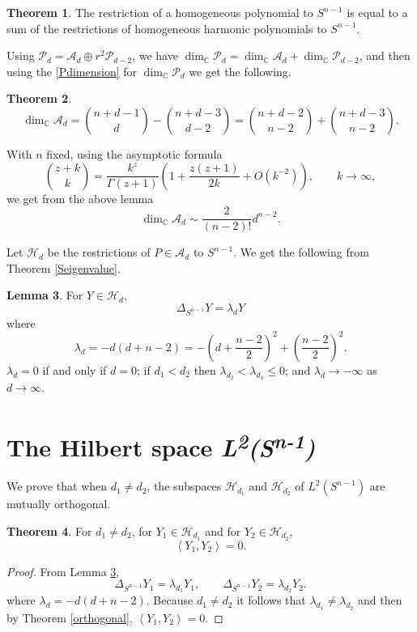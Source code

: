 \documentclass{article}
\newcommand{\inner}[2]{\left\langle #1, #2 \right\rangle}
\theoremstyle{definition}
\newtheorem{theorem}{Theorem}
\newtheorem{lemma}[theorem]{Lemma}
\theoremstyle{definition}
\begin{document}
\begin{theorem}
The restriction of a homogeneous polynomial to $S^{n-1}$ is equal to a sum of the restrictions of homogeneous 
harmonic polynomials to $S^{n-1}$. 
\label{homogeneoussum}
\end{theorem}

Using $\mathscr{P}_d = \mathscr{A}_d \oplus r^2 \mathscr{P}_{d-2}$, we
have $\dim_\mathbb{C} \mathscr{P}_d = \dim_{\mathbb{C}} \mathscr{A}_d + \dim_{\mathbb{C}} \mathscr{P}_{d-2}$, and then using
the  \eqref{Pdimension} for $\dim_\mathbb{C} \mathscr{P}_d$ we get the following.

\begin{theorem}
\[
\dim_\mathbb{C} \mathscr{A}_d = \binom{n+d-1}{d}-\binom{n+d-3}{d-2}
=\binom{n+d-2}{n-2}+\binom{n+d-3}{n-2}.
\]
\label{dimension}
\end{theorem}

With $n$ fixed, using the asymptotic formula
\[
\binom{z+k}{k} = \frac{k^z}{\Gamma(z+1)} \left(1+\frac{z(z+1)}{2k}+O(k^{-2})\right),\qquad k \to \infty,
\]
we get from the above lemma 
\[
\dim_\mathbb{C} \mathscr{A}_d  \sim \frac{2}{(n-2)!} d^{n-2}.
\]

Let $\mathscr{H}_d$ be the restrictions of $P \in \mathscr{A}_d$ to $S^{n-1}$. 
We get the following from  Theorem \ref{Seigenvalue}.

\begin{lemma}
For $Y \in \mathscr{H}_d$,
\[
\Delta_{S^{n-1}} Y =\lambda_d Y
\]
where
\[
\lambda_d = 
 -d(d+n-2)
 =
-\left(d+\frac{n-2}{2}\right)^2+\left(\frac{n-2}{2}\right)^2.
\]
$\lambda_d=0$ if and only if $d=0$; if $d_1<d_2$ then $\lambda_{d_2}<\lambda_{d_1} \leq 0$; and $\lambda_d \to -\infty$ as $d \to \infty$. 
\label{lambdad}
\end{lemma}


\section{The Hilbert space {\em L\textsuperscript{2}(S\textsuperscript{n-1})}} 
We prove that when $d_1 \neq d_2$, the subspaces
$\mathscr{H}_{d_1}$ and $\mathscr{H}_{d_2}$ of $L^2(S^{n-1})$
are mutually orthogonal.

\begin{theorem}
For $d_1 \neq d_2$, for $Y_1 \in \mathscr{H}_{d_1}$ and for $Y_2 \in \mathscr{H}_{d_2}$, 
\[
\inner{Y_1}{Y_2}=0.
\]
\label{Hdorthogonal}
\end{theorem}
\begin{proof}
From Lemma \ref{lambdad},
\[
\Delta_{S^{n-1}} Y_1 =\lambda_{d_1}Y_1,
\qquad
\Delta_{S^{n-1}} Y_2 =\lambda_{d_2}Y_2.
\]
where $\lambda_d =  -d(d+n-2)$. Because $d_1 \neq d_2$ it follows that
$\lambda_{d_1} \neq \lambda_{d_2}$ and then by Theorem \ref{orthogonal},
$\inner{Y_1}{Y_2}=0$.
\end{proof}
\end{document}
